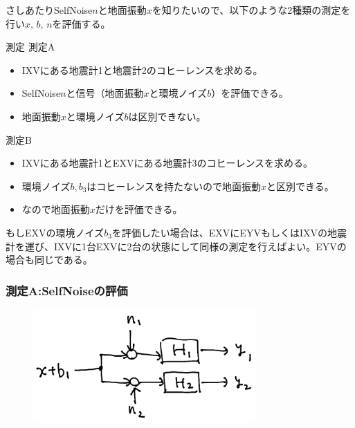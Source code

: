 さしあたりSelfNoise$n$と地面振動$x$を知りたいので、以下のような2種類の測定を行い$x,\,b,\,n$を評価する。
\begin{itembox}[l]{測定}
  測定A  
  \begin{itemize}
  \item IXVにある地震計1と地震計2のコヒーレンスを求める。
  \item SelfNoise$n$と信号（地面振動$x$と環境ノイズ$b$）を評価できる。
  \item 地面振動$x$と環境ノイズ$b$は区別できない。
  \end{itemize}
  測定B
  \begin{itemize}
  \item IXVにある地震計1とEXVにある地震計3のコヒーレンスを求める。
  \item 環境ノイズ$b,b_3$はコヒーレンスを持たないので地面振動$x$と区別できる。
  \item なので地面振動$x$だけを評価できる。
  \end{itemize}  
\end{itembox}
もしEXVの環境ノイズ$b_3$を評価したい場合は、EXVにEYVもしくはIXVの地震計を運び、IXVに1台EXVに2台の状態にして同様の測定を行えばよい。EYVの場合も同じである。

\subsubsection{測定A:SelfNoiseの評価}
\begin{figure}[H]
  \begin{center}
    \includegraphics[width=8.5cm]{./testA.png}
  \end{center}
  \caption{
  }\label{img:img_testA}
\end{figure}

